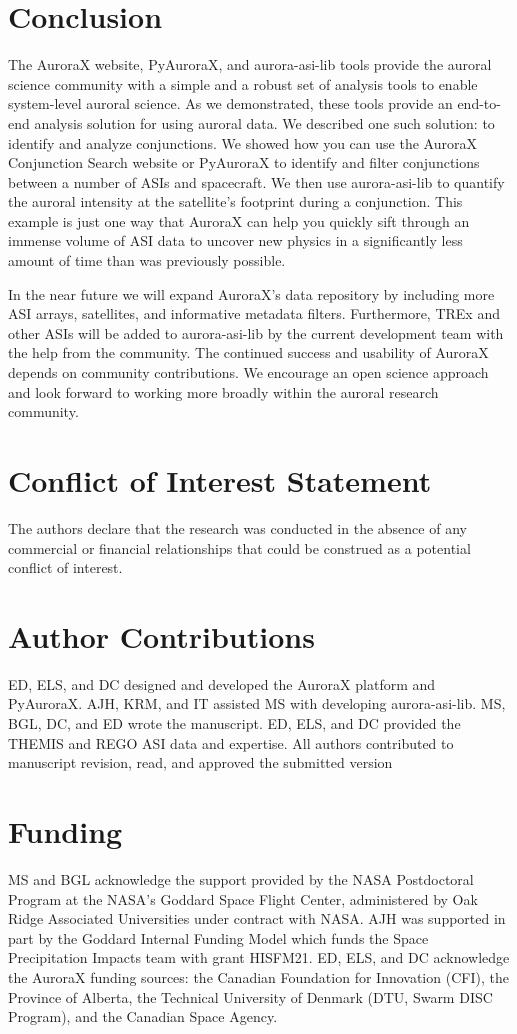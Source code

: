 \documentclass[utf8]{FrontiersinHarvard} %
\begin{document}
\section{Conclusion}
The AuroraX website, PyAuroraX, and aurora-asi-lib tools provide the auroral science community with a simple and a robust set of analysis tools to enable system-level auroral science. As we demonstrated, these tools provide an end-to-end analysis solution for using auroral data. We described one such solution: to identify and analyze conjunctions. We showed how you can use the AuroraX Conjunction Search website or PyAuroraX to identify and filter conjunctions between a number of ASIs and spacecraft. We then use aurora-asi-lib to quantify the auroral intensity at the satellite's footprint during a conjunction. This example is just one way that AuroraX can help you quickly sift through an immense volume of ASI data to uncover new physics in a significantly less amount of time than was previously possible.

In the near future we will expand AuroraX’s data repository by including more ASI arrays, satellites, and informative metadata filters. Furthermore, TREx and other ASIs will be added to aurora-asi-lib by the current development team with the help from the community. The continued success and usability of AuroraX depends on community contributions. We encourage an open science approach and look forward to working more broadly within the auroral research community.


\section*{Conflict of Interest Statement}
The authors declare that the research was conducted in the absence of any commercial or financial relationships that could be construed as a potential conflict of interest.

\section*{Author Contributions}
ED, ELS, and DC designed and developed the AuroraX platform and PyAuroraX. AJH, KRM, and IT assisted MS with developing aurora-asi-lib. MS, BGL, DC, and ED wrote the manuscript. ED, ELS, and DC provided the THEMIS and REGO ASI data and expertise.  All authors contributed to manuscript revision, read, and approved the submitted version

\section*{Funding}
MS and BGL acknowledge the support provided by the NASA Postdoctoral Program at the NASA's Goddard Space Flight Center, administered by Oak Ridge Associated Universities under contract with NASA. AJH was supported in part by the Goddard Internal Funding Model which funds the Space Precipitation Impacts team with grant HISFM21. ED, ELS, and DC acknowledge the AuroraX funding sources: the Canadian Foundation for Innovation (CFI), the Province of Alberta, the Technical University of Denmark (DTU, Swarm DISC Program), and the Canadian Space Agency.
\end{document}
